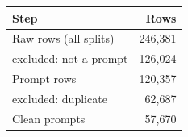 \begin{tabular}{lr}
\toprule
Step & Rows \\
\midrule
Raw rows (all splits) & 246,381 \\
\quad excluded: not a prompt & 126,024 \\
Prompt rows & 120,357 \\
\quad excluded: duplicate & 62,687 \\
Clean prompts & 57,670 \\
\bottomrule
\end{tabular}
